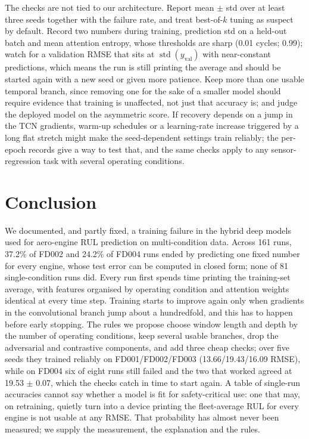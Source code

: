 The checks are not tied to our architecture. Report mean $\pm$ std over at
least three seeds together with the failure rate, and treat best-of-$k$
tuning as suspect by default. Record two numbers during training, prediction
std on a held-out batch and mean attention entropy, whose thresholds are
sharp (0.01 cycles; 0.99); watch for a validation RMSE that sits at
$\operatorname{std}(y_{\mathrm{val}})$ with near-constant predictions, which
means the run is still printing the average and should be started again with
a new seed or given more patience. Keep more than one usable temporal branch,
since removing one for the sake of a smaller model should require evidence
that training is unaffected, not just that accuracy is; and judge the
deployed model on the asymmetric score. If recovery depends on a jump in the
TCN gradients, warm-up schedules or a learning-rate increase triggered by a
long flat stretch might make the seed-dependent settings train reliably; the
per-epoch records give a way to test that, and the same checks apply to any
sensor-regression task with several operating conditions.

\section{Conclusion}
\label{sec:conclusion}

We documented, and partly fixed, a training failure in the hybrid deep
models used for aero-engine RUL prediction on multi-condition data. Across
161 runs, 37.2\% of FD002 and 24.2\% of FD004 runs ended by predicting one
fixed number for every engine, whose test error can be computed in closed
form; none of 81 single-condition runs did. Every run first spends time
printing the training-set average, with features organised by operating
condition and attention weights identical at every time step. Training
starts to improve again only when gradients in the convolutional branch jump
about a hundredfold, and this has to happen before early stopping. The rules
we propose choose window length and depth by the number of operating
conditions, keep several usable branches, drop the adversarial and
contrastive components, and add three cheap checks; over five seeds they
trained reliably on FD001/FD002/FD003 (13.66/19.43/16.09 RMSE), while on
FD004 six of eight runs still failed and the two that worked agreed at
19.53 $\pm$ 0.07, which the checks catch in time to start again. A table of
single-run accuracies cannot say whether a model is fit for safety-critical
use: one that may, on retraining, quietly turn into a device printing the
fleet-average RUL for every engine is not usable at any RMSE. That
probability has almost never been measured; we supply the measurement, the
explanation and the rules.
